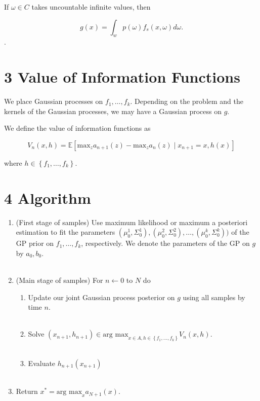 \documentclass[12pt,english]{article}
\begin{document}
If $\omega\in C$ takes uncountable infinite values, then 

\[
g\left(x\right)=\int_{w}p\left(\omega\right)f_{s}\left(x,\omega\right)d\omega.
\].

\section*{3 Value of Information Functions}

We place Gaussian processes on $f_{1},\ldots,f_{k}$. Depending on the problem and the kernels of the Gaussian processes, we may have a Gaussian process on $g$.

We define the value of information functions as

\[
V_{n}\left(x,h\right)=\mathbb{E}\left[\mbox{max}_{z}a_{n+1}\left(z\right)-\mbox{max}_{z}a_{n}\left(z\right)\mid x_{n+1}=x,h\left(x\right)\right]
\]

where $h\in\left\{ f_{1},\ldots,f_{k}\right\} $.


\section*{4 Algorithm}

\begin{enumerate}
\item (First stage of samples) Use maximum likelihood or maximum a posteriori estimation to fit the
parameters $\left(\mu_{0}^{1},\Sigma_{0}^{1}\right),\left(\mu_{0}^{2},\Sigma_{0}^{2}\right),\ldots,\left(\mu_{0}^{k},\Sigma_{0}^{k}\right))$ of the GP prior on $f_{1},\ldots,f_{k}$, respectively. We denote the parameters of the GP on $g$ by $a_{0},b_{0}$.\\
 \textrm{}\\
\item (Main stage of samples) For $n\leftarrow0$ to $N$ do
\begin{enumerate}
    \item Update our joint Gaussian process posterior on $g$ using all samples by time $n$.\\
    \textrm{}\\
\item Solve $\left(x_{n+1},h_{n+1}\right)\in\mbox{arg max}_{x\in A,h\in\left\{ f_{1},\ldots,f_{k}\right\} }V_{n}\left(x,h\right)$.\\
\textrm{}\\
\item Evaluate $h_{n+1}\left(x_{n+1}\right)$\\
\textrm{}\\
\end{enumerate}
\item Return $x^{*}=\mbox{arg max}_{x}a_{N+1}\left(x\right)$.
\end{enumerate}
\end{document}
